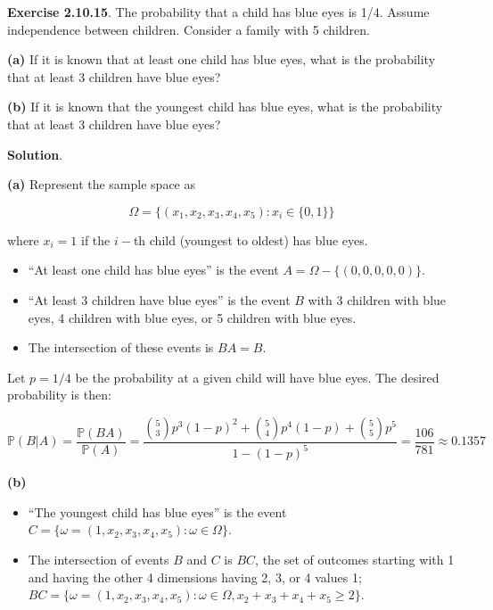 \textbf{Exercise 2.10.15}. The probability that a child has blue eyes is
1/4. Assume independence between children. Consider a family with 5
children.

\textbf{(a)} If it is known that at least one child has blue eyes, what
is the probability that at least 3 children have blue eyes?

\textbf{(b)} If it is known that the youngest child has blue eyes, what
is the probability that at least 3 children have blue eyes?

\textbf{Solution}.

\textbf{(a)} Represent the sample space as

\[ \Omega = \{ (x_1, x_2, x_3, x_4, x_5) : x_i \in \{ 0, 1 \} \} \]

where \(x_i = 1\) if the \(i-\)th child (youngest to oldest) has blue
eyes.

\begin{itemize}[tightlist]
\item
  ``At least one child has blue eyes'' is the event
  \(A = \Omega - \{ (0, 0, 0, 0, 0) \}\).\\
\item
  ``At least 3 children have blue eyes'' is the event \(B\) with 3
  children with blue eyes, 4 children with blue eyes, or 5 children with
  blue eyes.
\item
  The intersection of these events is \(BA = B\).
\end{itemize}

Let \(p = 1/4\) be the probability at a given child will have blue eyes.
The desired probability is then:

\[\mathbb{P}(B | A) = \frac{\mathbb{P}(BA)}{\mathbb{P}(A)} = \frac{
\binom{5}{3} p^3 (1 - p)^2 + \binom{5}{4} p^4 (1 - p) + \binom{5}{5} p^5
}{1 - \left(1 - p \right)^5} = \frac{106}{781} \approx 0.1357 \]

\textbf{(b)}

\begin{itemize}[tightlist]
\item
  ``The youngest child has blue eyes'' is the event
  \(C = \{ \omega = (1, x_2, x_3, x_4, x_5) : \omega \in \Omega \}\).
\item
  The intersection of events \(B\) and \(C\) is \(BC\), the set of
  outcomes starting with 1 and having the other 4 dimensions having 2,
  3, or 4 values 1;
  \(BC = \{ \omega = (1, x_2, x_3, x_4, x_5) : \omega \in \Omega, x_2 + x_3 + x_4 + x_5 \geq 2 \}\).
\end{itemize}

